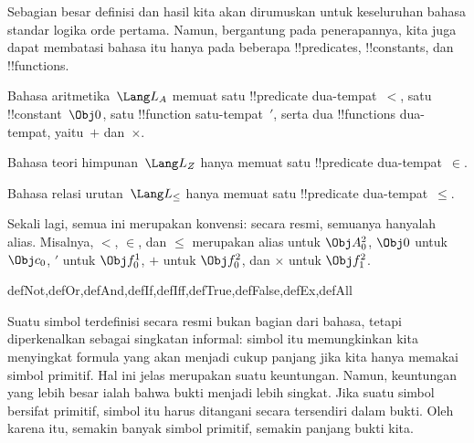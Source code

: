 \documentclass[../../../include/open-logic-section]{subfiles}
\begin{document}
Sebagian besar definisi dan hasil kita akan dirumuskan untuk keseluruhan
bahasa standar logika orde pertama. Namun, bergantung pada penerapannya, kita juga
dapat membatasi bahasa itu hanya pada beberapa !!{predicate}s,
!!{constant}s, dan !!{function}s.

\begin{ex}
Bahasa aritmetika~$\Lang L_A$ memuat satu !!{predicate} dua-tempat~$<$,
satu !!{constant}~$\Obj 0$, satu !!{function} satu-tempat~$\prime$, serta dua
!!{function}s dua-tempat, yaitu~$+$ dan~$\times$.
\end{ex}

\begin{ex}
Bahasa teori himpunan~$\Lang L_Z$ hanya memuat satu !!{predicate}
dua-tempat~$\in$.
\end{ex}

\begin{ex}
Bahasa relasi urutan~$\Lang L_\le$ hanya memuat satu !!{predicate}
dua-tempat~$\le$.
\end{ex}

Sekali lagi, semua ini merupakan konvensi: secara resmi, semuanya hanyalah
alias. Misalnya, $<$, $\in$, dan $\le$ merupakan alias untuk $\Obj A^2_0$,
$\Obj 0$ untuk $\Obj c_0$, $\prime$ untuk $\Obj f^1_0$, $+$ untuk $\Obj f^2_0$,
dan $\times$ untuk $\Obj f^2_1$.


\begin{tagblock}{defNot,defOr,defAnd,defIf,defIff,defTrue,defFalse,defEx,defAll}
\begin{explain}
Suatu simbol terdefinisi secara resmi bukan bagian dari bahasa, tetapi
diperkenalkan sebagai singkatan informal: simbol itu memungkinkan kita
menyingkat formula yang akan menjadi cukup panjang jika kita hanya memakai
simbol primitif. Hal ini jelas merupakan suatu keuntungan. Namun, keuntungan
yang lebih besar ialah bahwa bukti menjadi lebih singkat. Jika suatu simbol
bersifat primitif, simbol itu harus ditangani secara tersendiri dalam bukti.
Oleh karena itu, semakin banyak simbol primitif, semakin panjang bukti kita.
\end{explain}
\end{tagblock}
\end{document}
